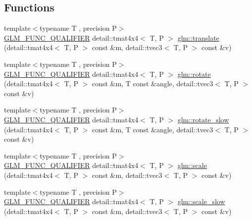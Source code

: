 \subsection*{Functions}
\begin{DoxyCompactItemize}
\item 
{\footnotesize template$<$typename T , precision P$>$ }\\\hyperlink{setup_8hpp_a33fdea6f91c5f834105f7415e2a64407}{G\+L\+M\+\_\+\+F\+U\+N\+C\+\_\+\+Q\+U\+A\+L\+I\+F\+I\+ER} detail\+::tmat4x4$<$ T, P $>$ \hyperlink{group__gtc__matrix__transform_ga1501de0fa580dcc491b67e0685bbc7c2}{glm\+::translate} (detail\+::tmat4x4$<$ T, P $>$ const \&m, detail\+::tvec3$<$ T, P $>$ const \&v)
\item 
{\footnotesize template$<$typename T , precision P$>$ }\\\hyperlink{setup_8hpp_a33fdea6f91c5f834105f7415e2a64407}{G\+L\+M\+\_\+\+F\+U\+N\+C\+\_\+\+Q\+U\+A\+L\+I\+F\+I\+ER} detail\+::tmat4x4$<$ T, P $>$ \hyperlink{group__gtc__matrix__transform_ga61e65a3bb227c267d1a15113d1056fb1}{glm\+::rotate} (detail\+::tmat4x4$<$ T, P $>$ const \&m, T const \&angle, detail\+::tvec3$<$ T, P $>$ const \&v)
\item 
{\footnotesize template$<$typename T , precision P$>$ }\\\hyperlink{setup_8hpp_a33fdea6f91c5f834105f7415e2a64407}{G\+L\+M\+\_\+\+F\+U\+N\+C\+\_\+\+Q\+U\+A\+L\+I\+F\+I\+ER} detail\+::tmat4x4$<$ T, P $>$ \hyperlink{namespaceglm_a03bd2c89f62ae44ad3a5e5dc21effd06}{glm\+::rotate\+\_\+slow} (detail\+::tmat4x4$<$ T, P $>$ const \&m, T const \&angle, detail\+::tvec3$<$ T, P $>$ const \&v)
\item 
{\footnotesize template$<$typename T , precision P$>$ }\\\hyperlink{setup_8hpp_a33fdea6f91c5f834105f7415e2a64407}{G\+L\+M\+\_\+\+F\+U\+N\+C\+\_\+\+Q\+U\+A\+L\+I\+F\+I\+ER} detail\+::tmat4x4$<$ T, P $>$ \hyperlink{group__gtc__matrix__transform_gabd40959f269abd16c256a4f59ab03d62}{glm\+::scale} (detail\+::tmat4x4$<$ T, P $>$ const \&m, detail\+::tvec3$<$ T, P $>$ const \&v)
\item 
{\footnotesize template$<$typename T , precision P$>$ }\\\hyperlink{setup_8hpp_a33fdea6f91c5f834105f7415e2a64407}{G\+L\+M\+\_\+\+F\+U\+N\+C\+\_\+\+Q\+U\+A\+L\+I\+F\+I\+ER} detail\+::tmat4x4$<$ T, P $>$ \hyperlink{namespaceglm_aa836cb5d035a8b96e5e9b4bb5dce0ab2}{glm\+::scale\+\_\+slow} (detail\+::tmat4x4$<$ T, P $>$ const \&m, detail\+::tvec3$<$ T, P $>$ const \&v)
\item 

\end{DoxyCompactItemize}
